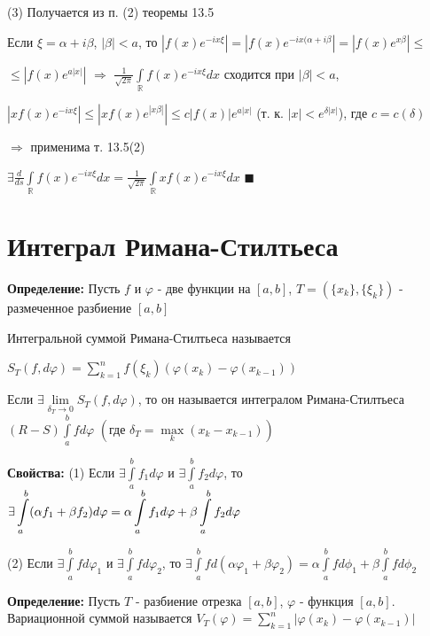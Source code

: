 \documentclass[a4paper]{report}
\newcommand*{\hm}[1]{#1\nobreak\discretionary{}%
            {\hbox{$\mathsurround=0pt #1$}}{}}
\begin{document}
(3) Получается из п. (2) теоремы 13.5

Если $\xi=\alpha+i\beta$, $|\beta|<a$, то $|f(x)e^{-ix\xi}|=|f(x)e^{-ix(\alpha+i\beta}|=|f(x)e^{x\beta}|\le$

\noindent $\le|f(x)e^{a|x|}|$ $\Rightarrow$ $\displaystyle\frac{1}{\sqrt{2\pi}}\displaystyle\int\limits_{\mathbb R}f(x)e^{-ix\xi}dx$ сходится при $|\beta|<a$, 

$|xf(x)e^{-ix\xi}|\le|xf(x)e^{|x\beta|}|\le c|f(x)|e^{a|x|}$ (т. к. $|x|<e^{\delta|x|}$), где $c=c(\delta)$ 

$\Rightarrow$ применима т. 13.5(2)

$\exists\displaystyle\frac{d}{ds}\displaystyle\int\limits_{\mathbb R}f(x)e^{-ix\xi}dx=\frac{1}{\sqrt{2\pi}}\displaystyle\int\limits_{\mathbb R}xf(x)e^{-ix\xi}dx$ $\blacksquare$






\chapter{Интеграл Римана-Стилтьеса}

\noindent\textbf{Определение:} Пусть $f$ и $\varphi$ - две функции на $[a,b]$, $T=\left(\{x_k\},\{\xi_k\}\right)$ - размеченное разбиение $[a,b]$

Интегральной суммой Римана-Стилтьеса называется 

$S_T(f,d\varphi)=\sum\limits_{k=1}^n f(\xi_k)\left(\varphi(x_k)-\varphi(x_{k-1})\right)$

Если $\exists\lim\limits_{\delta_T\to0}S_T(f,d\varphi)$, то он называется интегралом Римана-Стилтьеса $(R-S)\displaystyle\int\limits_a^b fd\varphi$ $\left(\text{где }\delta_T=\max\limits_k(x_k-x_{k-1})\right)$
\bigskip

\noindent\textbf{Свойства:} (1) Если $\exists\displaystyle\int\limits_a^bf_1d\varphi$ и $\exists\displaystyle\int\limits_a^b f_2d\varphi$, то $\exists \displaystyle\int\limits_a^b(\alpha f_1+\beta f_2)d\varphi=\alpha\displaystyle\int\limits_a^b f_1d\varphi\hm+\beta\displaystyle\int\limits_a^b f_2d\varphi$

(2) Если $\exists\displaystyle\int\limits_a^b fd\varphi_1$ и $\exists\displaystyle\int\limits_a^b fd\varphi_2$, то $\exists \displaystyle\int\limits_a^b fd(\alpha\varphi_1+\beta\varphi_2)=\alpha\displaystyle\int\limits_a^b fd\phi_1+\beta\displaystyle\int\limits_a^b fd\phi_2$
\bigskip

\noindent\textbf{Определение:} Пусть $T$ - разбиение отрезка $[a,b]$, $\varphi$ - функция $[a,b]$. Вариационной суммой называется $V_T(\varphi)=\sum\limits_{k=1}^n\left|\varphi(x_k)-\varphi(x_{k-1})\right|$
\end{document}
